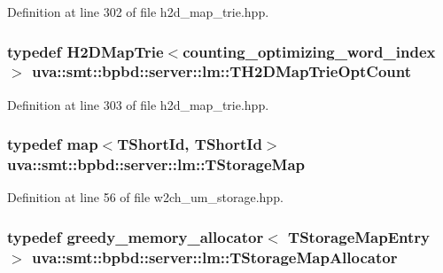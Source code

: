 Definition at line 302 of file h2d\+\_\+map\+\_\+trie.\+hpp.

\hypertarget{namespaceuva_1_1smt_1_1bpbd_1_1server_1_1lm_a3d797c5f90202da4ebb0616a2d9fc188}{}
\subsubsection[{T\+H2\+D\+Map\+Trie\+Opt\+Count}]{\setlength{\rightskip}{0pt plus 5cm}typedef {\bf H2\+D\+Map\+Trie}$<${\bf counting\+\_\+optimizing\+\_\+word\+\_\+index} $>$ {\bf uva\+::smt\+::bpbd\+::server\+::lm\+::\+T\+H2\+D\+Map\+Trie\+Opt\+Count}}\label{namespaceuva_1_1smt_1_1bpbd_1_1server_1_1lm_a3d797c5f90202da4ebb0616a2d9fc188}


Definition at line 303 of file h2d\+\_\+map\+\_\+trie.\+hpp.

\hypertarget{namespaceuva_1_1smt_1_1bpbd_1_1server_1_1lm_a848930f30620014225832ed8d3e6a93e}{}
\subsubsection[{T\+Storage\+Map}]{\setlength{\rightskip}{0pt plus 5cm}typedef map$<${\bf T\+Short\+Id}, {\bf T\+Short\+Id}$>$ {\bf uva\+::smt\+::bpbd\+::server\+::lm\+::\+T\+Storage\+Map}}\label{namespaceuva_1_1smt_1_1bpbd_1_1server_1_1lm_a848930f30620014225832ed8d3e6a93e}


Definition at line 56 of file w2ch\+\_\+um\+\_\+storage.\+hpp.

\hypertarget{namespaceuva_1_1smt_1_1bpbd_1_1server_1_1lm_a70b67dc80579cc0df5e9509d40b2563a}{}
\subsubsection[{T\+Storage\+Map\+Allocator}]{\setlength{\rightskip}{0pt plus 5cm}typedef {\bf greedy\+\_\+memory\+\_\+allocator}$<$ {\bf T\+Storage\+Map\+Entry} $>$ {\bf uva\+::smt\+::bpbd\+::server\+::lm\+::\+T\+Storage\+Map\+Allocator}}\label{namespaceuva_1_1smt_1_1bpbd_1_1server_1_1lm_a70b67dc80579cc0df5e9509d40b2563a}



